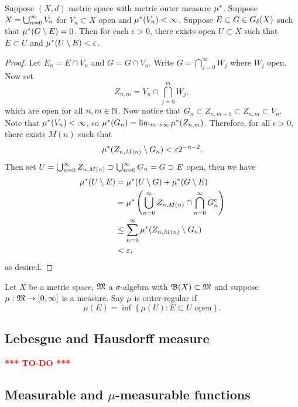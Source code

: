 \documentclass[a4paper]{article}
\newcommand{\TODO}{\textcolor{red}{\textbf{*** TO-DO ***}}}
\begin{document}
\begin{lemma}
Suppose $(X, d)$ metric space with metric outer measure 
$\mu^*$. Suppose $X = \bigcup_{n=0}^\infty V_n$ for $V_n \subset X$ open and 
$\mu^*(V_n) < \infty$. Suppose $E \subset G \in G_\delta(X)$ such that 
$\mu^*(G \setminus E) = 0$. Then for each $\epsilon > 0$, 
there exists open $U \subset X$ such that $E \subset U$
and $\mu^*(U \setminus E) < \varepsilon$.  

\end{lemma}

\begin{proof}

Let $E_n = E \cap V_n$ and $G = G \cap V_n$. Write 
$G = \bigcap_{j=0}^\infty W_j$ where $W_j$ open. 
Now set 
\[
Z_{n, m} = V_n \cap \bigcap_{j=0}^m W_j,
\]
which are open for all $n, m \in \mathbb{N}$.
Now notice that $G_n \subset Z_{n, m+1} \subset Z_{n,m} 
\subset V_n$. Note that $\mu^*(V_n) < \infty$, so 
$\mu^*(G_n) = \lim_{m \to \infty} \mu^*(Z_{n, m})$. Therefore, 
for all $\epsilon > 0$, there exists $M(n)$ such that 
\[
\mu^*(Z_{n, M(n)} \setminus G_n) < \varepsilon 2^{-n-2}.
\]
Then set $U = \bigcup_{n=0}^\infty Z_{n, M(n)} \supset \bigcup_{n=0}^\infty G_n = G 
\supset E$ open, then we have 
\[
\begin{aligned}
\mu^*(U \setminus E) 
&= \mu^*(U \setminus G) + \mu^*(G \setminus E)  \\
&= \mu^* \left( \bigcup_{n=0}^\infty Z_{n, M(n)} \cap
\bigcap_{n=0}^\infty G_n^c \right) \\
&\leq \sum_{n=0}^\infty \mu^*(Z_{n, M(n)} \setminus G_n) \\
&< \varepsilon,
\end{aligned}
\]
as desired.

\end{proof}


\begin{defi}
  Let $X$ be a metric space, $\mathfrak{M}$ a $\sigma$-algebra
  with $\mathfrak{B}(X) \subset \mathfrak{M}$ and suppose $\mu: \mathfrak{M} \to [0, \infty]$
  is a measure. Say $\mu$ is outer-regular if 
  \[
  \mu(E) = \inf \left\{ \mu(U) : E \subset U \text{ open} \right\}.
  \]
\end{defi}


\subsection{Lebesgue and Hausdorff measure}

\TODO

\subsection{Measurable and $\mu$-measurable functions}
\end{document}
